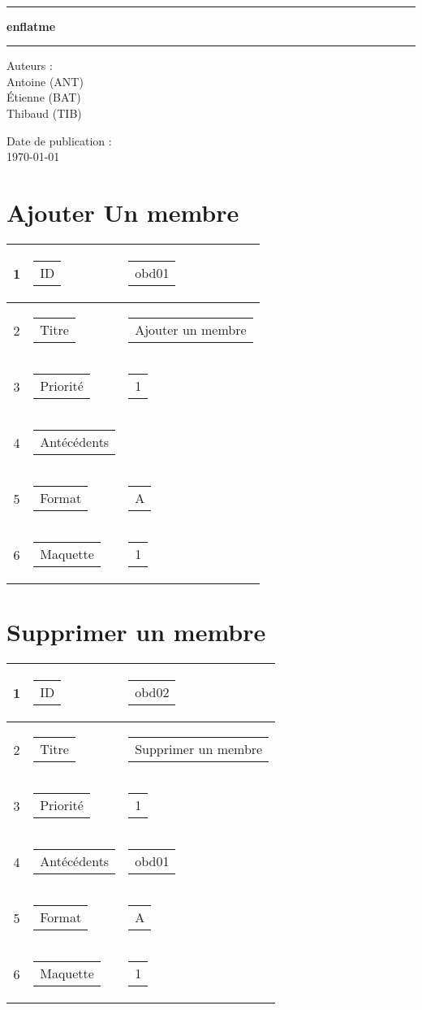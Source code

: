 \documentclass[a4paper, 12pt, french]{article}
\makeatletter
\newcommand{\nomProjet}{enflatme\xspace}
\newcommand{\retourLigne}[2][c]{\begin{tabular}[#1]{@{}l@{}}#2\end{tabular}}
\makeatother
\begin{document}
	\begin{titlepage}
		\begin{center}
			\LARGE{} \\
		    \rule{\linewidth}{1.5pt}
		    \huge{\textbf{\nomProjet}}
		    \rule{\linewidth}{1.5pt} \newline{} \newline{}
		\end{center}
		\begin{center}
		    \large{Auteurs :}\\ Antoine  (ANT)\\ Étienne  (BAT) \\ Thibaud  (TIB)
		\end{center}
		\vspace{50px}
		\begin{center}
			\large{Date de publication :}\\ \today
		\end{center}
	\end{titlepage}
	\newpage

	\section{Ajouter Un membre}
	\begin{longtable}{|c|l|l|}
 	\hline
    1 & \retourLigne{ID}  & \retourLigne{obd01} \\ \hline
  	\hline
    2 & \retourLigne{Titre}  & \retourLigne{Ajouter un membre} \\ \hline
    3 & \retourLigne{Priorité}  & \retourLigne{1} \\ \hline
    4 & \retourLigne{Antécédents}  & \retourLigne{} \\ \hline
    5 & \retourLigne{Format}  & \retourLigne{A} \\ \hline
    6 & \retourLigne{Maquette}  & \retourLigne{1} \\ \hline
	\end{longtable}

	\section{Supprimer un membre}
	\begin{longtable}{|c|l|l|}
 	\hline
    1 & \retourLigne{ID}  & \retourLigne{obd02} \\ \hline
  	\hline
    2 & \retourLigne{Titre}  & \retourLigne{Supprimer un membre} \\ \hline
    3 & \retourLigne{Priorité}  & \retourLigne{1} \\ \hline
    4 & \retourLigne{Antécédents}  & \retourLigne{obd01} \\ \hline
    5 & \retourLigne{Format}  & \retourLigne{A} \\ \hline
    6 & \retourLigne{Maquette}  & \retourLigne{1} \\ \hline
	\end{longtable}
\end{document}
